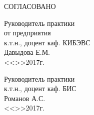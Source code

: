 \begin{singlespace}
СОГЛАСОВАНО \\
 \begin{minipage}[left]{0.45\textwidth}
 \begin{flushleft}
  Руководитель практики \\ 
  от предприятия \\
  к.т.н., доцент каф. КИБЭВС \\
  \underline{\hspace{3cm}} Давыдова Е.М. \\
  <<\underline{\hspace{1cm}}>>\underline{\hspace{3cm}}2017г.\\
 \end{flushleft}
 \end{minipage}
% 
% 
% 
\begin{minipage}[right]{0.45\textwidth}
 \begin{flushleft}
  Руководитель практики \\
  к.т.н., доцент каф. БИС \\
  \underline{\hspace{3cm}} Романов А.С. \\
  <<\underline{\hspace{1cm}}>>\underline{\hspace{3cm}}2017г.\\
  \end{flushleft}
  \end{minipage}

\end{singlespace}



